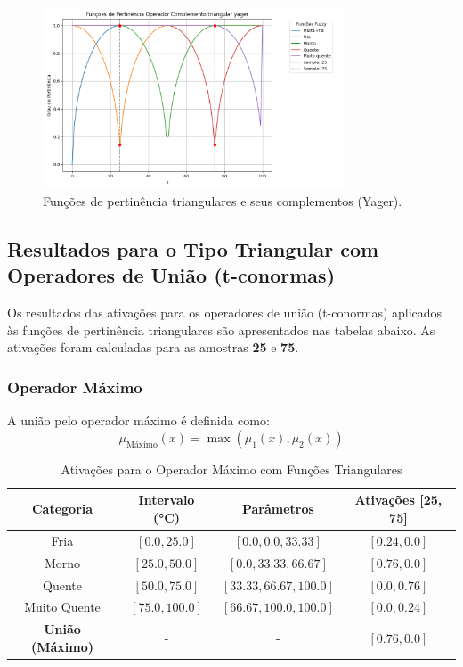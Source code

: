 \documentclass[a4paper,12pt]{article}
\begin{document}
\begin{figure}[H]
    \centering
    \includegraphics[width=0.8\textwidth]{img/funções_de_pertinência_operador_complemento_triangular_yager_fuzzificado.png}
    \caption{Funções de pertinência triangulares e seus complementos (Yager).}
    \label{fig:complemento_yager_triangular}
\end{figure}

\subsection{Resultados para o Tipo Triangular com Operadores de União (t-conormas)}

Os resultados das ativações para os operadores de união (t-conormas) aplicados às funções de pertinência triangulares são apresentados nas tabelas abaixo. As ativações foram calculadas para as amostras \textbf{25} e \textbf{75}.

\subsubsection{Operador Máximo}

A união pelo operador máximo é definida como:
\[
\mu_{\text{Máximo}}(x) = \max(\mu_1(x), \mu_2(x))
\]

\begin{table}[H]
\centering
\caption{Ativações para o Operador Máximo com Funções Triangulares}
\begin{tabular}{|c|c|c|c|}
\hline
\textbf{Categoria}    & \textbf{Intervalo (°C)} & \textbf{Parâmetros}       & \textbf{Ativações [25, 75]} \\ \hline
Fria                  & $[0.0, 25.0]$          & $[0.0, 0.0, 33.33]$       & $[0.24, 0.0]$              \\ \hline
Morno                 & $[25.0, 50.0]$         & $[0.0, 33.33, 66.67]$     & $[0.76, 0.0]$              \\ \hline
Quente                & $[50.0, 75.0]$         & $[33.33, 66.67, 100.0]$   & $[0.0, 0.76]$              \\ \hline
Muito Quente          & $[75.0, 100.0]$        & $[66.67, 100.0, 100.0]$   & $[0.0, 0.24]$              \\ \hline
\textbf{União (Máximo)} & -                     & -                         & $[0.76, 0.0]$             \\ \hline
\end{tabular}
\end{table}
\end{document}
